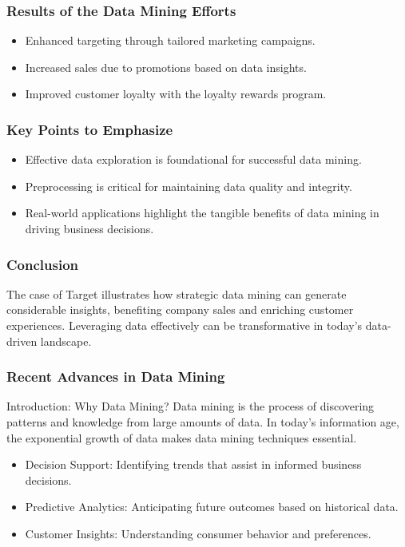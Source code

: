 \documentclass[aspectratio=169]{beamer}
\begin{document}
\begin{frame}[fragile]
    \frametitle{Results of the Data Mining Efforts}
    \begin{itemize}
        \item Enhanced targeting through tailored marketing campaigns.
        \item Increased sales due to promotions based on data insights.
        \item Improved customer loyalty with the loyalty rewards program.
    \end{itemize}
\end{frame}

\begin{frame}[fragile]
    \frametitle{Key Points to Emphasize}
    \begin{itemize}
        \item Effective data exploration is foundational for successful data mining.
        \item Preprocessing is critical for maintaining data quality and integrity.
        \item Real-world applications highlight the tangible benefits of data mining in driving business decisions.
    \end{itemize}
\end{frame}

\begin{frame}[fragile]
    \frametitle{Conclusion}
    The case of Target illustrates how strategic data mining can generate considerable insights, benefiting company sales and enriching customer experiences. Leveraging data effectively can be transformative in today's data-driven landscape.
\end{frame}

\begin{frame}[fragile]
    \frametitle{Recent Advances in Data Mining}
    
    \begin{block}{Introduction: Why Data Mining?}
        Data mining is the process of discovering patterns and knowledge from large amounts of data. In today's information age, the exponential growth of data makes data mining techniques essential.
    \end{block}

    \begin{itemize}
        \item Decision Support: Identifying trends that assist in informed business decisions.
        \item Predictive Analytics: Anticipating future outcomes based on historical data.
        \item Customer Insights: Understanding consumer behavior and preferences.
    \end{itemize}
\end{frame}
\end{document}
